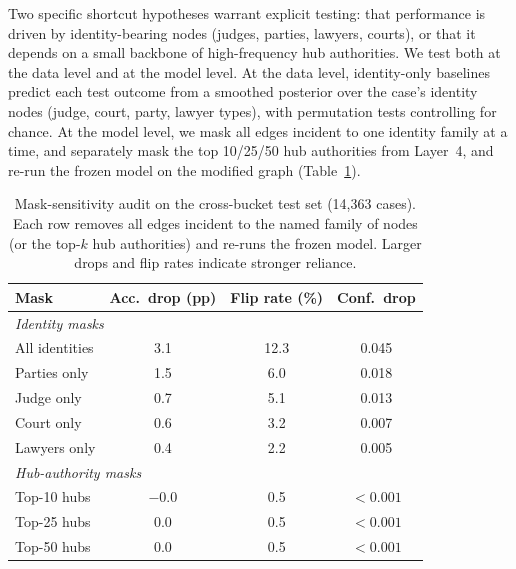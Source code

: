 \documentclass[runningheads]{llncs}
\begin{document}
Two specific shortcut hypotheses warrant explicit testing: that performance is driven by identity-bearing nodes (judges, parties, lawyers, courts), or that it depends on a small backbone of high-frequency hub authorities. We test both at the data level and at the model level. At the data level, identity-only baselines predict each test outcome from a smoothed posterior over the case's identity nodes (judge, court, party, lawyer types), with permutation tests controlling for chance. At the model level, we mask all edges incident to one identity family at a time, and separately mask the top 10/25/50 hub authorities from Layer~4, and re-run the frozen model on the modified graph (Table~\ref{tab:mask-sensitivity}).

\begin{table}[!t]
\centering
\caption{Mask-sensitivity audit on the cross-bucket test set (14{,}363 cases). Each row removes all edges incident to the named family of nodes (or the top-$k$ hub authorities) and re-runs the frozen model. Larger drops and flip rates indicate stronger reliance.}
\label{tab:mask-sensitivity}
\setlength{\tabcolsep}{6pt}
\renewcommand{\arraystretch}{1.15}
\small
\begin{tabular}{lccc}
\toprule
Mask & Acc.\ drop (pp) & Flip rate (\%) & Conf.\ drop \\
\midrule
\multicolumn{4}{l}{\textit{Identity masks}} \\
\midrule
All identities      & 3.1 & 12.3 & 0.045 \\
Parties only        & 1.5 & 6.0  & 0.018 \\
Judge only          & 0.7 & 5.1  & 0.013 \\
Court only          & 0.6 & 3.2  & 0.007 \\
Lawyers only        & 0.4 & 2.2  & 0.005 \\
\midrule
\multicolumn{4}{l}{\textit{Hub-authority masks}} \\
\midrule
Top-10 hubs         & $-0.0$ & 0.5 & $<0.001$ \\
Top-25 hubs         & 0.0    & 0.5 & $<0.001$ \\
Top-50 hubs         & 0.0    & 0.5 & $<0.001$ \\
\bottomrule
\end{tabular}
\end{table}
\end{document}
